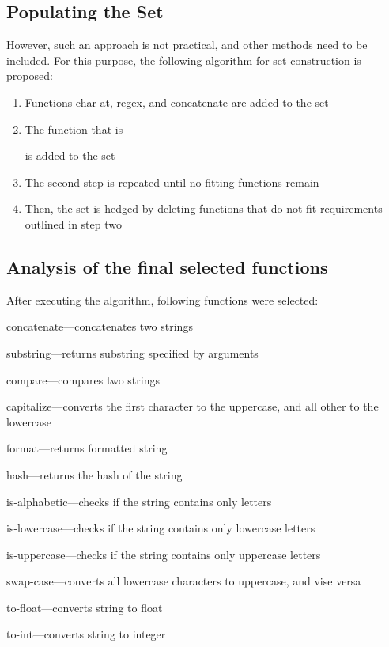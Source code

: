 \documentclass[11pt,nonacm,natbib=false]{acmart}
\begin{document}
\subsection{Populating the Set}
However, such an approach is not practical, and other methods need to be  included. For this purpose, the following algorithm for set construction is proposed:
\begin{enumerate}
    \item Functions char-at, regex, and concatenate are added to the set
    \item The function that is 
        is added to the set
    \item The second step is repeated until no fitting functions remain
    \item Then, the set is hedged by deleting functions that do not fit requirements outlined in step two
\end{enumerate}
\subsection{Analysis of the final selected functions}
After executing the algorithm, following functions were selected:
\begin{inparaenum}
    \item concatenate---concatenates two strings
    \item substring---returns substring specified by arguments
    \item compare---compares two strings
    \item capitalize---converts the first character to the uppercase, and all other to the lowercase
    \item format---returns formatted string
    \item hash---returns the hash of the string
    \item is-alphabetic---checks if the string contains only letters
    \item is-lowercase---checks if the string contains only lowercase letters
    \item is-uppercase---checks if the string contains only uppercase letters
    \item swap-case---converts all lowercase characters to uppercase, and vise versa
    \item to-float---converts string to float
    \item to-int---converts string to integer
\end{inparaenum}
\end{document}
